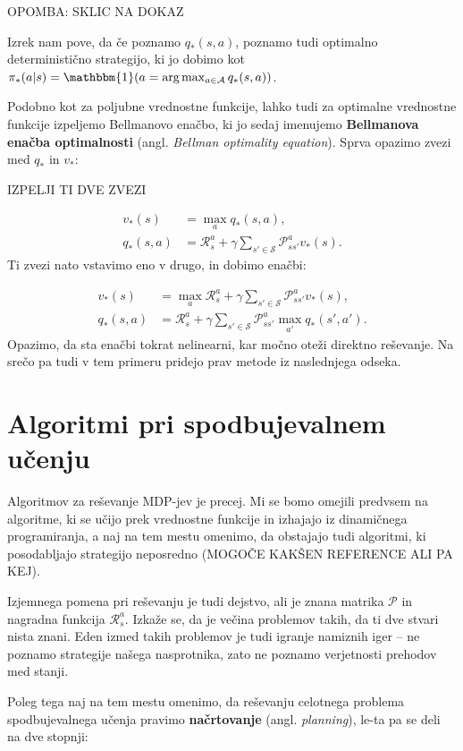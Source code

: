\documentclass[12pt,a4paper]{amsart}
\theoremstyle{definition} %
\theoremstyle{plain} %
\begin{document}
OPOMBA: SKLIC NA DOKAZ

Izrek nam pove, da če poznamo $q_*(s, a)$, poznamo tudi optimalno deterministično strategijo, 
ki jo dobimo kot $\pi_*(a|s) = \mathbbm{1} (a =\text{arg}\max_{a \in \mathcal{A}} q_*(s, a))$.

Podobno kot za poljubne vrednostne funkcije, lahko tudi za optimalne vrednostne funkcije 
izpeljemo Bellmanovo enačbo, ki jo sedaj imenujemo \textbf{Bellmanova enačba optimalnosti} (angl. 
\textit{Bellman optimality equation}). Sprva opazimo zvezi med $q_*$ in $v_*$:

IZPELJI TI DVE ZVEZI

\begin{align*}
    v_*(s) &= \max_a q_*(s, a), \\
    q_*(s, a) &= \mathcal{R}_s^a + \gamma \sum_{s' \in \mathcal{S}} \mathcal{P}_{ss'}^a v_*(s).
\end{align*}
Ti zvezi nato vstavimo eno v drugo, in dobimo enačbi: 

\begin{align}\label{beo}
    v_*(s) &= \max_a \mathcal{R}_s^a + \gamma \sum_{s' \in \mathcal{S}} \mathcal{P}_{ss'}^a v_*(s), \\
    q_*(s, a) &= \mathcal{R}_s^a + 
                \gamma \sum_{s' \in \mathcal{S}} \mathcal{P}_{ss'}^a \max_{a'} q_*(s', a').
\end{align}
Opazimo, da sta enačbi tokrat nelinearni, kar močno oteži direktno reševanje. Na srečo pa tudi 
v tem primeru pridejo prav metode iz naslednjega odseka.

\section{Algoritmi pri spodbujevalnem učenju}
\label{algoritmi}
Algoritmov za reševanje MDP-jev je precej. Mi se bomo omejili predvsem na algoritme, ki se učijo 
prek vrednostne funkcije in izhajajo iz dinamičnega programiranja, a naj na tem mestu omenimo, 
da obstajajo tudi algoritmi, ki posodabljajo strategijo neposredno (MOGOČE KAKŠEN REFERENCE ALI 
PA KEJ).

Izjemnega pomena pri reševanju je tudi dejstvo, ali je znana matrika $\mathcal{P}$ in nagradna 
funkcija $\mathcal{R}_s^a$. Izkaže se, da je večina problemov takih, da ti dve stvari nista znani. 
Eden izmed takih problemov je tudi igranje namiznih iger -- ne poznamo strategije našega nasprotnika, 
zato ne poznamo verjetnosti prehodov med stanji.

Poleg tega naj na tem mestu omenimo, da reševanju celotnega problema spodbujevalnega učenja 
pravimo \textbf{načrtovanje} (angl. \textit{planning}), le-ta pa se deli na dve stopnji: 
\end{document}
